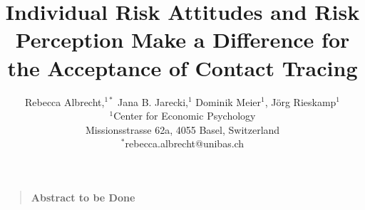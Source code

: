 \documentclass[12pt]{article}
\title{Individual Risk Attitudes and Risk Perception Make a Difference for the Acceptance of Contact Tracing}
\author
{Rebecca Albrecht,${}^{1\ast}$ Jana B. Jarecki,${}^{1}$ Dominik Meier${}^{1}$, Jörg Rieskamp${}^{1}$\\
\normalsize{${}^{1}$Center for Economic Psychology}\\
\normalsize{Missionsstrasse 62a, 4055 Basel, Switzerland}\\
\normalsize{$^\ast$rebecca.albrecht@unibas.ch}
}
\date{}
\newenvironment{sciabstract}{%
\begin{quote} \bf}
{\end{quote}}
\begin{document}
 


\baselineskip24pt


\maketitle 





\begin{sciabstract}
  Abstract to be Done
\end{sciabstract}



\end{document}
